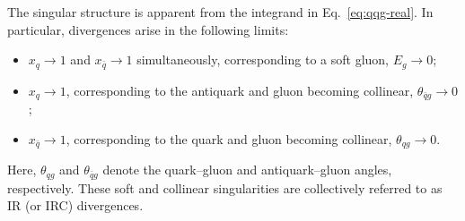 The singular structure is apparent from the integrand in
Eq.~\eqref{eq:qqg-real}. In particular, divergences arise in the
following limits:
\begin{itemize}
\item $x_q\to1$ and $x_{\bar{q}}\to1$ simultaneously, corresponding
to a soft gluon, $E_g\to0$;
\item $x_q\to1$, corresponding to the antiquark and gluon becoming
collinear, $\theta_{\bar{q}g}\to0$;
\item $x_{\bar{q}}\to1$, corresponding to the quark and gluon becoming
collinear, $\theta_{qg}\to0$.
\end{itemize}
Here, $\theta_{qg}$ and $\theta_{\bar{q}g}$ denote the quark--gluon and
antiquark--gluon angles, respectively. These soft and collinear singularities are 
collectively referred to as IR (or IRC) divergences. 

